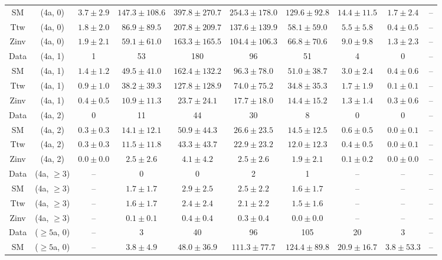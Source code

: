 \begin{table}[h!]
{\begin{tabular}{cccccccccc}
	SM & (4a, 0) & $3.7\pm 2.9$ & $147.3\pm 108.6$ & $397.8\pm 270.7$ & $254.3\pm 178.0$ & $129.6\pm 92.8$ & $14.4\pm 11.5$ & $1.7\pm 2.4$ & -- \\[0.5ex] 
	Ttw & (4a, 0) & $1.8\pm 2.0$ & $86.9\pm 89.5$ & $207.8\pm 209.7$ & $137.6\pm 139.9$ & $58.1\pm 59.0$ & $5.5\pm 5.8$ & $0.4\pm 0.5$ & -- \\[0.5ex] 
	Zinv & (4a, 0) & $1.9\pm 2.1$ & $59.1\pm 61.0$ & $163.3\pm 165.5$ & $104.4\pm 106.3$ & $66.8\pm 70.6$ & $9.0\pm 9.8$ & $1.3\pm 2.3$ & -- \\[0.5ex] 
	Data & (4a, 1) & 1 & 53 & 180 & 96 & 51 & 4 & 0 & -- \\[0.5ex] 
	SM & (4a, 1) & $1.4\pm 1.2$ & $49.5\pm 41.0$ & $162.4\pm 132.2$ & $96.3\pm 78.0$ & $51.0\pm 38.7$ & $3.0\pm 2.4$ & $0.4\pm 0.6$ & -- \\[0.5ex] 
	Ttw & (4a, 1) & $0.9\pm 1.0$ & $38.2\pm 39.3$ & $127.8\pm 128.9$ & $74.0\pm 75.2$ & $34.8\pm 35.3$ & $1.7\pm 1.9$ & $0.1\pm 0.1$ & -- \\[0.5ex] 
	Zinv & (4a, 1) & $0.4\pm 0.5$ & $10.9\pm 11.3$ & $23.7\pm 24.1$ & $17.7\pm 18.0$ & $14.4\pm 15.2$ & $1.3\pm 1.4$ & $0.3\pm 0.6$ & -- \\[0.5ex] 
	Data & (4a, 2) & 0 & 11 & 44 & 30 & 8 & 0 & 0 & -- \\[0.5ex] 
	SM & (4a, 2) & $0.3\pm 0.3$ & $14.1\pm 12.1$ & $50.9\pm 44.3$ & $26.6\pm 23.5$ & $14.5\pm 12.5$ & $0.6\pm 0.5$ & $0.0\pm 0.1$ & -- \\[0.5ex] 
	Ttw & (4a, 2) & $0.3\pm 0.3$ & $11.5\pm 11.8$ & $43.3\pm 43.7$ & $22.9\pm 23.2$ & $12.0\pm 12.3$ & $0.4\pm 0.5$ & $0.0\pm 0.1$ & -- \\[0.5ex] 
	Zinv & (4a, 2) & $0.0\pm 0.0$ & $2.5\pm 2.6$ & $4.1\pm 4.2$ & $2.5\pm 2.6$ & $1.9\pm 2.1$ & $0.1\pm 0.2$ & $0.0\pm 0.0$ & -- \\[0.5ex] 
	Data & (4a, $\ge3$) & -- & 0 & 0 & 2 & 1 & -- & -- & -- \\[0.5ex] 
	SM & (4a, $\ge3$) & -- & $1.7\pm 1.7$ & $2.9\pm 2.5$ & $2.5\pm 2.2$ & $1.6\pm 1.7$ & -- & -- & -- \\[0.5ex] 
	Ttw & (4a, $\ge3$) & -- & $1.6\pm 1.7$ & $2.4\pm 2.4$ & $2.1\pm 2.2$ & $1.5\pm 1.6$ & -- & -- & -- \\[0.5ex] 
	Zinv & (4a, $\ge3$) & -- & $0.1\pm 0.1$ & $0.4\pm 0.4$ & $0.3\pm 0.4$ & $0.0\pm 0.0$ & -- & -- & -- \\[0.5ex] 
	Data & ($\ge5$a, 0) & -- & 3 & 40 & 96 & 105 & 20 & 3 & -- \\[0.5ex] 
	SM & ($\ge5$a, 0) & -- & $3.8\pm 4.9$ & $48.0\pm 36.9$ & $111.3\pm 77.7$ & $124.4\pm 89.8$ & $20.9\pm 16.7$ & $3.8\pm 53.3$ & -- \\[0.5ex] 

\end{tabular}}
\end{table}

